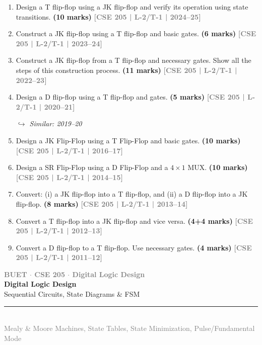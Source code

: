 \documentclass[12pt,a3paper]{article}
\newcommand{\yr}[1]{\hfill\textcolor{gray}{\small\textbf{[#1]}}}
\newcommand{\mk}[1]{\textcolor{orange!70!black}{\small\textbf{(#1 marks)}}}
\newcommand{\variant}[1]{\par\vspace{1pt}\textcolor{blue!50!black}%
  {\footnotesize\textit{$\hookrightarrow$ Similar: #1}}}
\newcommand{\secdivider}[4]{%
  \newpage\thispagestyle{empty}%
  \vspace*{\fill}%
  \begin{tcolorbox}[enhanced,colback=#4!7,colframe=#3,boxrule=1.5pt,arc=8pt,
    left=20pt,right=20pt,top=22pt,bottom=22pt,
    shadow={3pt}{-3pt}{0pt}{black!15}]
    \centering
    {\large\textcolor{gray}{\textbf{BUET $\cdot$ CSE 205 $\cdot$ Digital Logic Design}}}\\[8pt]
    {\fontsize{26}{32}\selectfont\bfseries\textcolor{#3}{Digital Logic Design}}\\[6pt]
    {\fontsize{15}{19}\selectfont\textcolor{dgray}{#1}}\\[12pt]
    \textcolor{#3!60}{\rule{0.5\textwidth}{0.5pt}}\\[6pt]
    {\small\textcolor{gray}{#2}}
  \end{tcolorbox}%
  \vspace*{\fill}\newpage%
}
\begin{document}
\begin{enumerate}

\item Design a T flip-flop using a JK flip-flop and verify its operation using state transitions.
\mk{10} \yr{CSE 205 | L-2/T-1 | 2024--25}

\item Construct a JK flip-flop using a T flip-flop and basic gates.
\mk{6} \yr{CSE 205 | L-2/T-1 | 2023--24}

\item Construct a JK flip-flop from a T flip-flop and necessary gates. Show all the steps of this construction process.
\mk{11} \yr{CSE 205 | L-2/T-1 | 2022--23}

\item Design a D flip-flop using a T flip-flop and gates.
\mk{5} \yr{CSE 205 | L-2/T-1 | 2020--21}
\variant{2019--20}

\item Design a JK Flip-Flop using a T Flip-Flop and basic gates.
\mk{10} \yr{CSE 205 | L-2/T-1 | 2016--17}


\item Design a SR Flip-Flop using a D Flip-Flop and a $4\times1$ MUX.
\mk{10} \yr{CSE 205 | L-2/T-1 | 2014--15}


\item Convert: (i) a JK flip-flop into a T flip-flop, and (ii) a D flip-flop into a JK flip-flop.
\mk{8} \yr{CSE 205 | L-2/T-1 | 2013--14}


\item Convert a T flip-flop into a JK flip-flop and vice versa.
\mk{4+4} \yr{CSE 205 | L-2/T-1 | 2012--13}

\item Convert a D flip-flop to a T flip-flop. Use necessary gates.
\mk{4} \yr{CSE 205 | L-2/T-1 | 2011--12}

\end{enumerate}


\secdivider{Sequential Circuits, State Diagrams \& FSM}{Mealy \& Moore Machines, State Tables, State Minimization, Pulse/Fundamental Mode}{cF}{teal}
\end{document}

